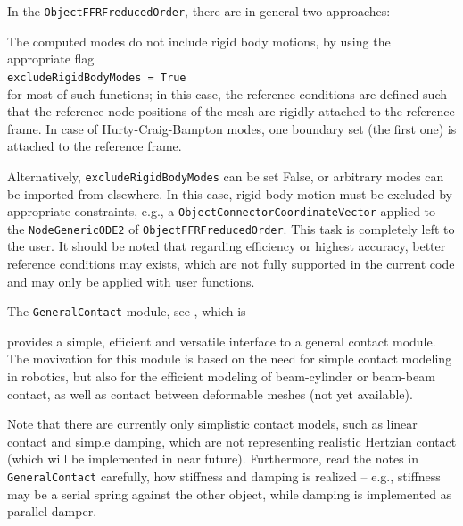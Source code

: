 In the \texttt{ObjectFFRFreducedOrder}, there are in general two approaches:
\bi
  \item The computed modes do not include rigid body motions, by using the appropriate flag\\ \texttt{excludeRigidBodyModes = True}\\ for most of such functions; in this case, the reference conditions are defined such that the reference node positions of the mesh are rigidly attached to the reference frame. In case of Hurty-Craig-Bampton modes, one boundary set (the first one) is attached to the reference frame.
  \item Alternatively, \texttt{excludeRigidBodyModes} can be set False, or arbitrary modes can be imported from elsewhere.
    In this case, rigid body motion must be excluded by appropriate constraints, e.g., a \texttt{ObjectConnectorCoordinateVector} applied to the \texttt{NodeGenericODE2} of \texttt{ObjectFFRFreducedOrder}. This task is completely left to the user.
\ei
It should be noted that regarding efficiency or highest accuracy, better reference conditions may exists, which are not fully supported in the current code and may only be applied with user functions.






















\clearpage
% 
The \texttt{GeneralContact} module, see ,  which is 
\bi
  \item[] 
\ei
provides a simple, efficient and versatile interface to a general contact module. The movivation for this module is based on the need for simple contact modeling in robotics, but also for the efficient modeling of beam-cylinder or beam-beam contact, as well as contact between deformable meshes (not yet available).

Note that there are currently only simplistic contact models, such as linear contact and simple damping, which are not representing realistic Hertzian contact (which will be implemented in near future). Furthermore, read the notes in \texttt{GeneralContact} carefully, how stiffness and damping is realized -- e.g., stiffness may be a serial spring against the other object, while damping is implemented as parallel damper.

